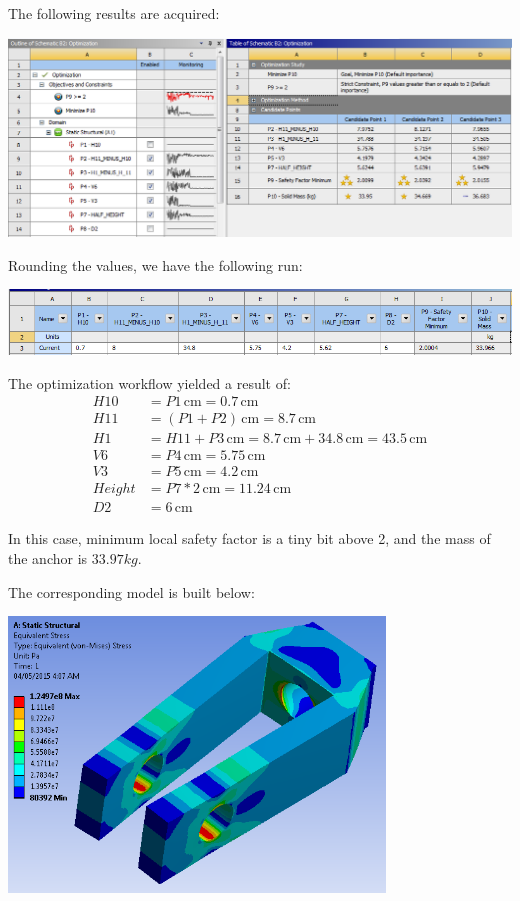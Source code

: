 \documentclass[a4paper,14pt]{extarticle}
\newcommand{\cm}{\,\si{\centi\meter}}
\begin{document}
The following results are acquired:

\includegraphics[width=\textwidth]{ASO_RESULT_1.PNG}

Rounding the values, we have the following run:

\includegraphics[width=\textwidth]{EX_OPTM_FINAL.PNG}

The optimization workflow yielded a result of:
\begin{align*}
H10 &= P1 \cm = 0.7 \cm\\
H11 &= (P1 + P2) \cm = 8.7 \cm\\
H1 &= H11 + P3 \cm = 8.7 \cm + 34.8 \cm = 43.5 \cm\\
V6 &= P4 \cm = 5.75 \cm\\
V3 &= P5 \cm = 4.2 \cm\\
Height &= P7 * 2 \cm = 11.24 \cm\\
D2 &= 6 \cm 
\end{align*}

In this case, minimum local safety factor is a tiny bit above 2, and the mass of the anchor is $33.97kg$. 

The corresponding model is built below:

\begin{center}\includegraphics[width=0.75\textwidth]{EX_3.PNG}\end{center}
\end{document}

